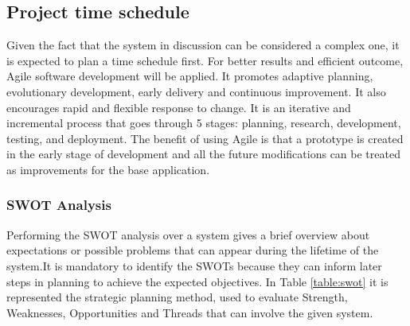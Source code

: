 \newpage
\subsection{Project time schedule}
Given the fact that the system in discussion can be considered a complex one, it is expected to plan a time schedule first. For better results and efficient outcome, Agile software development will be applied. It promotes adaptive planning, evolutionary development, early delivery and continuous improvement. It also encourages rapid and flexible response to change. It is an iterative and incremental process that goes through 5 stages: planning, research, development, testing, and deployment. The benefit of using Agile is that a prototype is created in the early stage of development and all the future modifications can be treated as improvements for the base application.

\subsubsection{SWOT Analysis}
Performing the SWOT analysis over a system gives a brief overview about expectations or possible problems that can appear during the lifetime of the system.It is mandatory to identify the SWOTs because they can inform later steps in planning to achieve the expected objectives. In Table \ref{table:swot}  it is represented the strategic planning method, used to evaluate Strength, Weaknesses, Opportunities and Threads that can involve the given system.


